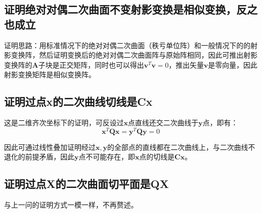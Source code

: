 \documentclass[11pt]{article}
\begin{document}
\subsection{证明绝对对偶二次曲面不变射影变换是相似变换，反之也成立}
证明思路：用标准情况下的绝对对偶二次曲面（秩亏单位阵）和一般情况下的的射影变换阵，然后证明变换后的绝对对偶二次曲面阵与原始阵相同，因此可推出射影变换阵的$\mathbf{A}$子块是正交矩阵，同时也可以得出$\mathbf{v}^T\mathbf{v}=0$，推出矢量$\mathbf{v}$是零向量，因此射影变换矩阵是相似变换阵。
\subsection{证明过点x的二次曲线切线是Cx}
这是二维齐次坐标下的证明，可反设过$\mathbf{x}$点直线还交二次曲线于$\mathbf{y}$点，即有：
\begin{equation*}
  \mathbf{x}^T\mathbf{Qx}=\mathbf{y}^T\mathbf{Qy}=0
\end{equation*}\par
因此可通过线性叠加证明经过$\mathbf{x,y}$的全部点的直线都在二次曲线上，与二次曲线不退化的前提矛盾，因此$\mathbf{y}$点不可能存在，即$\mathbf{x}$点的切线是$\mathbf{Cx}$。
\subsection{证明过点X的二次曲面切平面是QX}
与上一问的证明方式一模一样，不再赘述。
\end{document}
